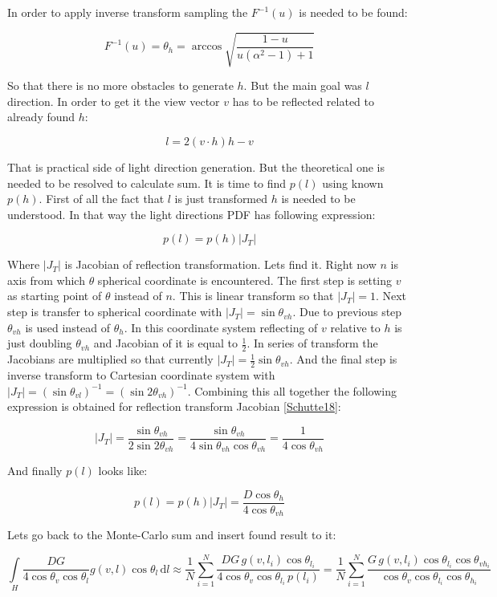 In order to apply inverse transform sampling the $F^{-1}(u)$ is needed to be found\+:

\[F^{-1}(u) = \theta_h = \arccos\sqrt{\frac{1-u}{u(\alpha^2-1)+1}}\]

So that there is no more obstacles to generate $h$. But the main goal was $l$ direction. In order to get it the view vector $v$ has to be reflected related to already found $h$\+:

\[l = 2(v \cdot h)h - v\]

That is practical side of light direction generation. But the theoretical one is needed to be resolved to calculate sum. It is time to find $p(l)$ using known $p(h)$. First of all the fact that $l$ is just transformed $h$ is needed to be understood. In that way the light direction\textquotesingle{}s P\+DF has following expression\+:

\[p(l) = p(h)|J_T|\]

Where $|J_T|$ is Jacobian of reflection transformation. Lets find it. Right now $n$ is axis from which $\theta$ spherical coordinate is encountered. The first step is setting $v$ as starting point of $\theta$ instead of $n$. This is linear transform so that $|J_T| = 1$. Next step is transfer to spherical coordinate with $|J_T| = \sin\theta_{vh}$. Due to previous step $\theta_{vh}$ is used instead of $\theta_h$. In this coordinate system reflecting of $v$ relative to $h$ is just doubling $\theta_{vh}$ and Jacobian of it is equal to $\frac{1}{2}$. In series of transform the Jacobians are multiplied so that currently $|J_T| = \frac{1}{2}\sin\theta_{vh}$. And the final step is inverse transform to Cartesian coordinate system with $|J_T| = (\sin\theta_{vl})^{-1} = (\sin2\theta_{vh})^{-1}$. Combining this all together the following expression is obtained for reflection transform Jacobian \mbox{[}\hyperlink{specification__pbr_math_Schutte18}{Schutte18}\mbox{]}\+:

\[|J_T| = \frac{\sin\theta_{vh}}{2\sin2\theta_{vh}} = \frac{\sin\theta_{vh}}{4\sin\theta_{vh}\cos\theta_{vh}} = \frac{1}{4\cos\theta_{vh}}\]

And finally $p(l)$ looks like\+:

\[p(l) = p(h)|J_T| = \frac{D\cos\theta_h}{4\cos\theta_{vh}}\]

Lets go back to the Monte-\/\+Carlo sum and insert found result to it\+:

\[\int\limits_H \frac{DG}{4\cos\theta_v \cos\theta_l} g(v, l) \cos\theta_l\, \mathrm{d}l \approx \frac{1}{N} \sum_{i=1}^N \frac{DG\, g(v, l_i) \cos\theta_{l_i}}{4\cos\theta_v \cos\theta_{l_i}\, p(l_i)} = \frac{1}{N} \sum_{i=1}^N \frac{G\, g(v, l_i) \cos\theta_{l_i} \cos\theta_{vh_i}}{\cos\theta_v \cos\theta_{l_i} \cos\theta_{h_i}}\]

